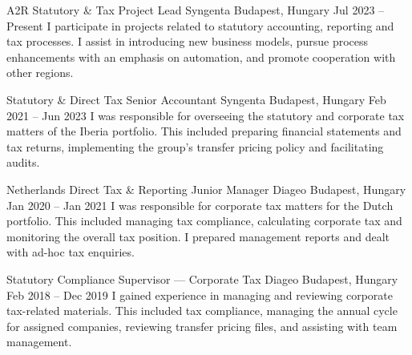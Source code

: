 


\begin{cventries}


  \cventry
    {A2R Statutory \& Tax Project Lead} %
    {Syngenta} %
    {Budapest, Hungary} %
    {Jul 2023 -- Present} %
    {I participate in projects related to statutory accounting, reporting and tax processes. I assist in introducing new business models, pursue process enhancements with an emphasis on automation, and promote cooperation with other regions.} %
    {} %


  \cventry
    {Statutory \& Direct Tax Senior Accountant} %
    {Syngenta} %
    {Budapest, Hungary} %
    {Feb 2021 -- Jun 2023} %
    {I was responsible for overseeing the statutory and corporate tax matters of the Iberia portfolio. This included preparing financial statements and tax returns, implementing the group's transfer pricing policy and facilitating audits.} %
    {} %


  \cventry
    {Netherlands Direct Tax \& Reporting Junior Manager} %
    {Diageo} %
    {Budapest, Hungary} %
    {Jan 2020 -- Jan 2021} %
    {I was responsible for corporate tax matters for the Dutch portfolio. This included managing tax compliance, calculating corporate tax and monitoring the overall tax position. I prepared management reports and dealt with ad-hoc tax enquiries.} %
    {} %


  \cventry
    {Statutory Compliance Supervisor — Corporate Tax} %
    {Diageo} %
    {Budapest, Hungary} %
    {Feb 2018 -- Dec 2019} %
    {I gained experience in managing and reviewing corporate tax-related materials. This included tax compliance, managing the annual cycle for assigned companies, reviewing transfer pricing files, and assisting with team management.} %
    {} %


\end{cventries}
